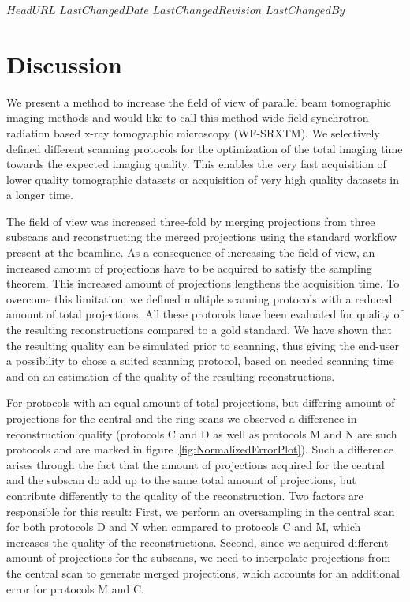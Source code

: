 \svnidlong
{$HeadURL$}
{$LastChangedDate$}
{$LastChangedRevision$}
{$LastChangedBy$}
%
%
\section{Discussion}
\label{sec:Discussion}
We present a method to increase the field of view of parallel beam tomographic imaging methods and would like to call this method wide field synchrotron radiation based x-ray tomographic microscopy (WF-SRXTM). We selectively defined different scanning protocols for the optimization of the total imaging time towards the expected imaging quality. This enables the very fast acquisition of lower quality tomographic datasets or acquisition of very high quality datasets in a longer time.

The field of view was increased three-fold by merging projections from three subscans and reconstructing the merged projections using the standard workflow present at the beamline. As a consequence of increasing the field of view, an increased amount of projections have to be acquired to satisfy the sampling theorem. This increased amount of projections lengthens the acquisition time. To overcome this limitation, we defined multiple scanning protocols with a reduced amount of total projections. All these protocols have been evaluated for quality of the resulting reconstructions compared to a gold standard. We have shown that the resulting quality can be simulated prior to scanning, thus giving the end-user a possibility to chose a suited scanning protocol, based on needed scanning time and on an estimation of the quality of the resulting reconstructions.

For protocols with an equal amount of total projections, but differing amount of projections for the central and the ring scans we observed a difference in reconstruction quality (protocols C and D as well as protocols M and N are such protocols and are marked in figure~\ref{fig:NormalizedErrorPlot}). Such a difference arises through the fact that the amount of projections acquired for the central and the subscan do add up to the same total amount of projections, but contribute differently to the quality of the reconstruction. Two factors are responsible for this result: First, we perform an oversampling in the central scan for both protocols D and N when compared to protocols C and M, which increases the quality of the reconstructions. Second, since we acquired different amount of projections for the subscans, we need to interpolate projections from the central scan to generate merged projections, which accounts for an additional error for protocols M and C.


